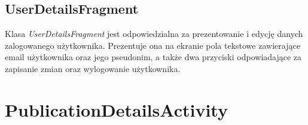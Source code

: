 \documentclass[a4paper,12pt,twoside,openany]{report}
\begin{document}
\subsection{UserDetailsFragment}
Klasa \textit{UserDetailsFragment} jest odpowiedzialna za prezentowanie i edycję danych zalogowanego użytkownika. Prezentuje ona na ekranie pola tekstowe zawierające email użytkownika oraz jego pseudonim, a także dwa przyciski odpowiadające za zapisanie zmian oraz wylogowanie użytkownika. 

\section{PublicationDetailsActivity}

\begin{thebibliography}{99}



\end{thebibliography}

\zakonczenie  %
\end{document}

